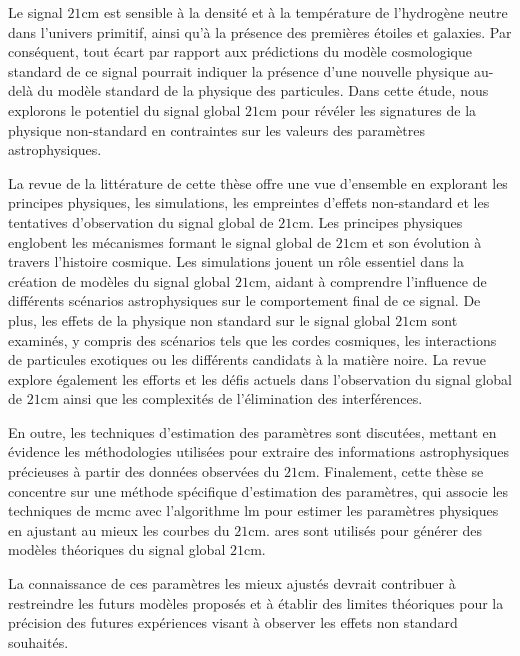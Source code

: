 \documentclass[12pt, TexShade, letterpaper]{report}
\begin{document}
Le signal $\mathrm{21cm}$ est sensible à la densité et à la température de l'hydrogène neutre dans l'univers primitif, ainsi qu'à la présence des premières étoiles et galaxies. Par conséquent, tout écart par rapport aux prédictions du modèle cosmologique standard de ce signal pourrait indiquer la présence d'une nouvelle physique au-delà du modèle standard de la physique des particules. Dans cette étude, nous explorons le potentiel du signal global $\mathrm{21cm}$ pour révéler les signatures de la physique non-standard en contraintes sur les valeurs des paramètres astrophysiques.\par

La revue de la littérature de cette thèse offre une vue d'ensemble en explorant les principes physiques, les simulations, les empreintes d'effets non-standard et les tentatives d'observation du signal global de $\mathrm{21cm}$. Les principes physiques englobent les mécanismes formant le signal global de $\mathrm{21cm}$ et son évolution à travers l'histoire cosmique. Les simulations jouent un rôle essentiel dans la création de modèles du signal global $\mathrm{21cm}$, aidant à comprendre l'influence de différents scénarios astrophysiques sur le comportement final de ce signal. De plus, les effets de la physique non standard sur le signal global $\mathrm{21cm}$ sont examinés, y compris des scénarios tels que les cordes cosmiques, les interactions de particules exotiques ou les différents candidats à la matière noire. La revue explore également les efforts et les défis actuels dans l'observation du signal global de $\mathrm{21cm}$ ainsi que les complexités de l'élimination des interférences.\par

En outre, les techniques d'estimation des paramètres sont discutées, mettant en évidence les méthodologies utilisées pour extraire des informations astrophysiques précieuses à partir des données observées du $\mathrm{21cm}$. Finalement, cette thèse se concentre sur une méthode spécifique d'estimation des paramètres, qui associe les techniques de \gls{mcmc} avec l'algorithme \gls{lm} pour estimer les paramètres physiques en ajustant au mieux les courbes du $\mathrm{21cm}$. \gls{ares} sont utilisés pour générer des modèles théoriques du signal global $\mathrm{21cm}$.\par

La connaissance de ces paramètres les mieux ajustés devrait contribuer à restreindre les futurs modèles proposés et à établir des limites théoriques pour la précision des futures expériences visant à observer les effets non standard souhaités.\par
\end{document}
